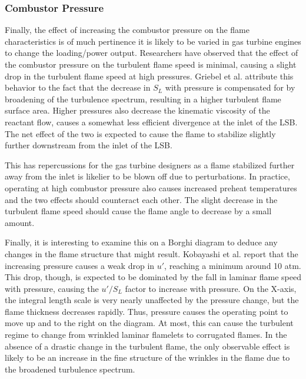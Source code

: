 \subsubsection{Combustor Pressure}

Finally, the effect of increasing the combustor pressure on the flame characteristics is of much pertinence it is likely to be varied in gas turbine engines to change the loading/power output.
Researchers\cite{1998-kobayashi,2002-kobayashi-b} have observed that the effect of the combustor pressure on the turbulent flame speed is minimal, causing a slight drop in the turbulent flame speed at high pressures.
Griebel et al.\cite{2007-griebel} attribute this behavior to the fact that the decrease in \(S_L\) with pressure is compensated for by broadening of the turbulence spectrum, resulting in a higher turbulent flame surface area.
Higher pressures also decrease the kinematic viscosity of the reactant flow, causes a somewhat less efficient divergence at the inlet of the LSB.
The net effect of the two is expected to cause the flame to stabilize slightly further downstream from the inlet of the LSB.

This has repercussions for the gas turbine designers as a flame stabilized further away from the inlet is likelier to be blown off due to perturbations.
In practice, operating at high combustor pressure also causes increased preheat temperatures and the two effects should counteract each other.
The slight decrease in the turbulent flame speed should cause the flame angle to decrease by a small amount.

Finally, it is interesting to examine this on a Borghi diagram to deduce any changes in the flame structure that might result.
Kobayashi et al.\cite{1997-kobayashi} report that the increasing pressure causes a weak drop in \(u'\), reaching a minimum around 10 atm.
This drop, though, is expected to be dominated by the fall in laminar flame speed with pressure, causing the \(u'/S_L\) factor to increase with pressure.
On the X-axis, the integral length scale is very nearly unaffected by the pressure change, but the flame thickness decreases rapidly.
Thus, pressure causes the operating point to move up and to the right on the diagram.
At most, this can cause the turbulent regime to change from wrinkled laminar flamelets to corrugated flames.
In the absence of a drastic change in the turbulent flame, the only observable effect is likely to be an increase in the fine structure of the wrinkles in the flame due to the broadened turbulence spectrum.

